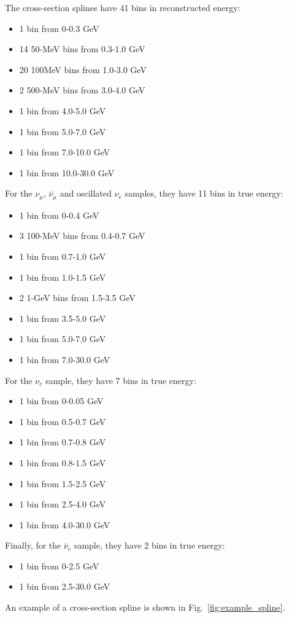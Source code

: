 The cross-section splines have 41 bins in reconstructed energy:
\begin{itemize}
\item 1 bin from 0-0.3 GeV
\item 14 50-MeV bins from 0.3-1.0 GeV
\item 20 100MeV bins from 1.0-3.0 GeV
\item 2 500-MeV bins from 3.0-4.0 GeV
\item 1 bin from 4.0-5.0 GeV
\item 1 bin from 5.0-7.0 GeV
\item 1 bin from 7.0-10.0 GeV
\item 1 bin from 10.0-30.0 GeV
\end{itemize}
For the $\nu_{\mu}$, $\bar{\nu}_{\mu}$ and oscillated $\nu_{e}$ samples, they have 11 bins in true energy:
\begin{itemize}
\item 1 bin from 0-0.4 GeV
\item 3 100-MeV bins from 0.4-0.7 GeV
\item 1 bin from 0.7-1.0 GeV
\item 1 bin from 1.0-1.5 GeV
\item 2 1-GeV bins from 1.5-3.5 GeV
\item 1 bin from 3.5-5.0 GeV
\item 1 bin from 5.0-7.0 GeV
\item 1 bin from 7.0-30.0 GeV  
\end{itemize}
For the $\nu_{e}$ sample, they have 7 bins in true energy:
\begin{itemize}
\item 1 bin from 0-0.05 GeV
\item 1 bin from 0.5-0.7 GeV
\item 1 bin from 0.7-0.8 GeV
\item 1 bin from 0.8-1.5 GeV
\item 1 bin from 1.5-2.5 GeV
\item 1 bin from 2.5-4.0 GeV
\item 1 bin from 4.0-30.0 GeV 
\end{itemize}
Finally, for the $\bar{\nu}_{e}$ sample, they have 2 bins in true energy:
\begin{itemize}
\item 1 bin from 0-2.5 GeV
\item 1 bin from 2.5-30.0 GeV
\end{itemize}

An example of a cross-section spline is shown in Fig.\ \ref{fig:example_spline}. 

